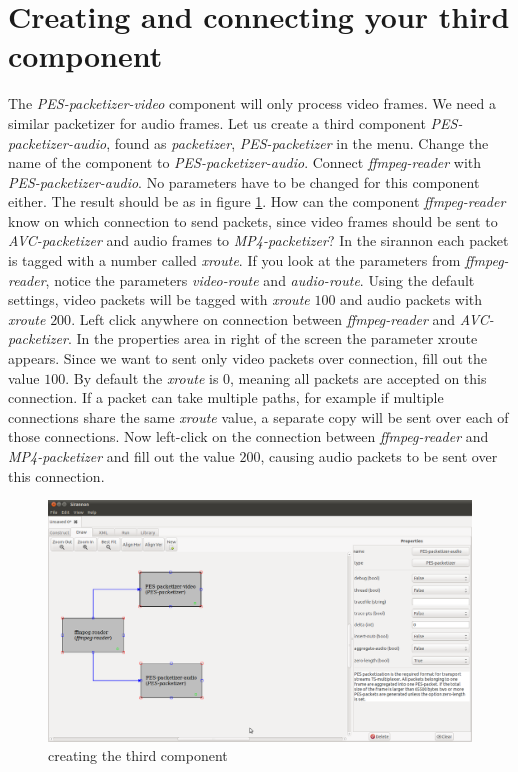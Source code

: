 \documentclass[12pt]{report}
\begin{document}
\section{Creating and connecting your third component}
\label{sec:route}
The \textit{PES-packetizer-video} component will only process video frames. We need a similar packetizer for audio frames. Let us create a third component \textit{PES-packetizer-audio}, found as \textit{packetizer}, \textit{PES-packetizer} in the menu. Change the name of the component to \textit{PES-packetizer-audio}. Connect \textit{ffmpeg-reader} with \textit{PES-packetizer-audio}. No parameters have to be changed for this component either. The result should be as in figure \ref{fig:11}. How can the component \textit{ffmpeg-reader} know on which connection to send packets, since video frames should be sent to \textit{AVC-packetizer} and audio frames to \textit{MP4-packetizer}? In the sirannon each packet is tagged with a number called \textit{xroute}. If you look at the parameters from \textit{ffmpeg-reader}, notice the parameters \textit{video-route} and \textit{audio-route}. Using the default settings, video packets will be tagged with \textit{xroute} $100$ and audio packets with \textit{xroute} $200$. Left click anywhere on connection between \textit{ffmpeg-reader} and \textit{AVC-packetizer}. In the properties area in right of the screen the parameter xroute appears. Since we want to sent only video packets over connection, fill out the value $100$. By default the \textit{xroute} is $0$, meaning all packets are accepted on this connection. If a packet can take multiple paths, for example if multiple connections share the same \textit{xroute} value, a separate copy will be sent over each of those connections. Now left-click on the connection between \textit{ffmpeg-reader} and \textit{MP4-packetizer} and fill out the value $200$, causing audio packets to be sent over this connection.
\begin{center}
\begin{figure}[!ht]
	\includegraphics[width=1.0\textwidth]{./images/ui06.png}
	\caption{creating the third component}
	\label{fig:11}
\end{figure}
\end{center}
\newpage
\end{document}
